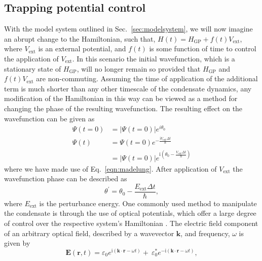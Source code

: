 \subsection{Trapping potential control}\label{ss:pert_opt_latt}
With the model system outlined in Sec.~\ref{sec:modelsystem}, we will now imagine an abrupt change to the Hamiltonian, such that, $H(t) = H_{\textrm{GP}} + f(t) V_{\textrm{ext}}$, where $V_{\textrm{ext}}$ is an external potential, and $f(t)$ is some function of time to control the application of $V_{\textrm{ext}}$. In this scenario the initial wavefunction, which is a stationary state of $H_{\textrm{GP}}$, will no longer remain so provided that $H_{\textrm{GP}}$ and $f(t) V_{\textrm{ext}}$ are non-commuting. Assuming the time of application of the additional term is much shorter than any other timescale of the condensate dynamics, any modification of the Hamiltonian in this way can be viewed as a method for changing the phase of the resulting wavefunction.
The resulting effect on the wavefunction can be given as
\begin{subequations}
\begin{align}
    \Psi(t=0) &= |\Psi(t=0)|e^{i\theta_0} \\
    \Psi(t) &= \Psi(t=0) e^{-\frac{\textrm{i} V_{\textrm{ext}} \Delta t}{\hbar}} \\
            &= |\Psi(t=0)| e^{\textrm{i}\left(\theta_0 - \frac{V_{\textrm{ext}} \Delta t}{\hbar}\right)} \nonumber
\end{align}
\end{subequations}
where we have made use of Eq.~\eqref{eqn:madelung}. After application of $V_{\textrm{ext}}$ the wavefunction phase can be described as
\begin{equation}
    \theta^{'} = \theta_0 - \frac{E_{\textrm{ext}} \Delta t}{\hbar},
\end{equation}
where $E_{\textrm{ext}}$ is the perturbance energy. One commonly used method to manipulate the condensate is through the use of optical potentials, which offer a large degree of control over the respective system's Hamiltonian \cite{BEC:Bloch_revmodphys_2008}. The electric field component of an arbitrary optical field, described by a wavevector $\mathbf{k}$, and frequency, $\omega$ is given by
\begin{equation}
    \mathbf{E}(\mathbf{r},t) = \varepsilon_0 e^{\textrm{i}\left(\mathbf{k}\cdot\mathbf{r} - \omega t\right)} + \ \varepsilon_0^{*} e^{-\textrm{i}\left(\mathbf{k}\cdot\mathbf{r} - \omega t\right)},
\end{equation}
